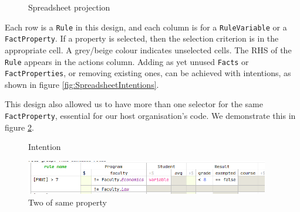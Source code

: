 \begin{figure}[h]
    \centering
    \caption{Spreadsheet projection}
    \label{fig:SpreadsheetProjection}
\end{figure}

Each row is a \texttt{Rule} in this design, and each column is for a \texttt{RuleVariable} or a \texttt{FactProperty}.
If a property is selected, then the selection criterion is in the appropriate cell.
A grey/beige colour indicates unselected cells.
The RHS of the \texttt{Rule} appears in the actions column.
Adding as yet unused \texttt{Facts} or \texttt{FactProperties}, or removing existing ones, can be achieved with intentions, as shown in figure \ref{fig:SpreadsheetIntentions}.

This design also allowed us to have more than one selector for the same \texttt{FactProperty}, essential for our host organisation's code.
We demonstrate this in figure \ref{fig:TwoProperties}.

\begin{figure}
    \centering
    \begin{minipage}{0.35\textwidth}
        \centering
        \caption{Intention}
        \label{fig:SpreadsheetIntentions}
    \end{minipage}\hfill
    \begin{minipage}{0.65\textwidth}
        \centering
        \includegraphics[width=0.95\textwidth]{Sections/images/spreadsheetTwoProperties.png} 
        \caption{Two of same property}
        \label{fig:TwoProperties}
    \end{minipage}
\end{figure}

